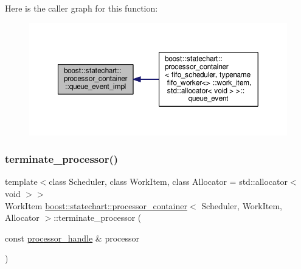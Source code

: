 Here is the caller graph for this function\+:
\nopagebreak
\begin{figure}[H]
\begin{center}
\leavevmode
\includegraphics[width=350pt]{classboost_1_1statechart_1_1processor__container_ad09f73c626dbd09da54efef6e00ca9c5_icgraph}
\end{center}
\end{figure}
\mbox{\label{classboost_1_1statechart_1_1processor__container_aaf9ad46333b3d8f490769788ced131a2}} 
\subsubsection{\texorpdfstring{terminate\+\_\+processor()}{terminate\_processor()}}
{\footnotesize\ttfamily template$<$class Scheduler, class Work\+Item, class Allocator = std\+::allocator$<$ void $>$$>$ \\
Work\+Item \mbox{\hyperlink{classboost_1_1statechart_1_1processor__container}{boost\+::statechart\+::processor\+\_\+container}}$<$ Scheduler, Work\+Item, Allocator $>$\+::terminate\+\_\+processor (\begin{DoxyParamCaption}\item[{const \mbox{\hyperlink{classboost_1_1statechart_1_1processor__container_a82ebbffaed81d7b99119ae0e892f6411}{processor\+\_\+handle}} \&}]{processor }\end{DoxyParamCaption})\hspace{0.3cm}{\ttfamily [inline]}}

